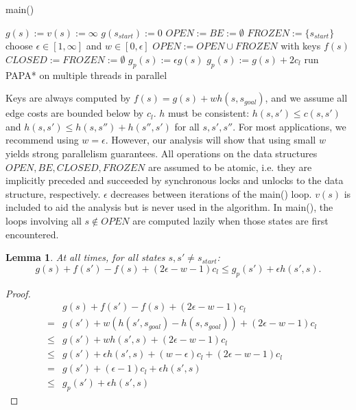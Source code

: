 \documentclass[letterpaper]{article}
\newtheorem{lemma}{Lemma}
\begin{document}
\begin{algorithm}
\caption{main()}
\label{alg:main}
\begin{algorithmic}
\STATE $g(s) := v(s) := \infty$
\ENDFOR
\STATE $g(s_{start}) := 0$
\STATE $OPEN := BE := \emptyset$
\STATE $FROZEN := \{s_{start}\}$
\REPEAT
\STATE choose $\epsilon \in [1,\infty]$ and $w \in [0,\epsilon]$
\STATE $OPEN := OPEN \cup FROZEN$ with keys $f(s)$
\STATE $CLOSED := FROZEN := \emptyset$
\STATE $g_p(s) := \epsilon g(s)$
\ENDFOR
{}
\STATE $g_p(s) := g(s) + 2c_l$
\ENDFOR
\STATE run PAPA* on multiple threads in parallel
\end{algorithmic}
\end{algorithm}

Keys are always computed by $f(s) = g(s) + wh(s,s_{goal})$, and we assume all edge costs are bounded below by $c_l$. $h$ must be consistent: $h(s,s') \le c(s,s')$ and $h(s,s') \le h(s,s'')+h(s'',s')$ for all $s,s',s''$. For most applications, we recommend using $w = \epsilon$. However, our analysis will show that using small $w$ yields strong parallelism guarantees. All operations on the data structures $OPEN,BE,CLOSED,FROZEN$ are assumed to be atomic, i.e. they are implicitly preceded and succeeded by synchronous locks and unlocks to the data structure, respectively. $\epsilon$ decreases between iterations of the main() loop. $v(s)$ is included to aid the analysis but is never used in the algorithm. In main(), the loops involving all $s\notin OPEN$ are computed lazily when those states are first encountered.

\begin{lemma}
\label{lem:indep}
At all times, for all states $s,s' \ne s_{start}$:
\[g(s) + f(s') - f(s) + (2\epsilon-w-1) c_l \le g_p(s') + \epsilon h(s',s).\]
\end{lemma}

\begin{proof}
\begin{eqnarray*}
&&g(s) + f(s') - f(s) + (2\epsilon-w-1) c_l
\\&=& g(s') + w(h(s',s_{goal}) - h(s,s_{goal})) + (2\epsilon-w-1) c_l
\\&\le& g(s') + wh(s',s) + (2\epsilon-w-1) c_l
\\&\le& g(s') + \epsilon h(s',s) + (w-\epsilon) c_l + (2\epsilon-w-1) c_l
\\&=& g(s') + (\epsilon-1) c_l + \epsilon h(s',s)
\\&\le& g_p(s') + \epsilon h(s',s)
\end{eqnarray*}
\end{proof}
\end{document}
